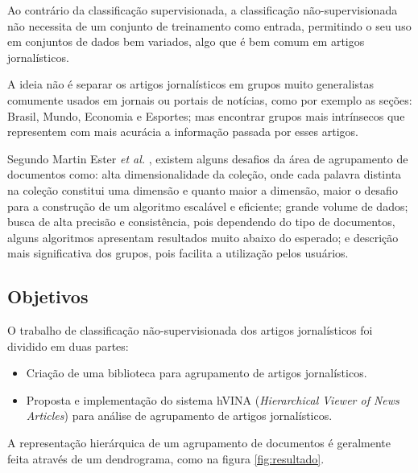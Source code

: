 \documentclass[a4paper,12pt]{article}
\begin{document}
Ao contrário da classificação supervisionada, a classificação não-supervisionada não necessita de um conjunto de treinamento como entrada, permitindo o seu uso em conjuntos de dados bem variados, algo que é bem comum em artigos jornalísticos.

A ideia não é separar os artigos jornalísticos em grupos muito generalistas comumente usados em jornais ou portais de notícias, como por exemplo as seções: Brasil, Mundo, Economia e Esportes; mas encontrar grupos mais intrínsecos que representem com mais acurácia a informação passada por esses artigos.

Segundo Martin Ester \textit{et al.} \cite{Ester03}, existem alguns desafios da área de agrupamento de documentos como: alta dimensionalidade da coleção, onde cada palavra distinta na coleção constitui uma dimensão e quanto maior a dimensão, maior o desafio para a construção de um algoritmo escalável e eficiente; grande volume de dados; busca de alta precisão e consistência, pois dependendo do tipo de documentos, alguns algoritmos apresentam resultados muito abaixo do esperado; e descrição mais significativa dos grupos, pois facilita a utilização pelos usuários.

\subsection{Objetivos}

O trabalho de classificação não-supervisionada dos artigos jornalísticos foi dividido em duas partes:

\begin{itemize}
\item Criação de uma biblioteca para agrupamento de artigos jornalísticos.
\item Proposta e implementação do sistema hVINA (\textit{Hierarchical Viewer of News Articles}) para análise de agrupamento de artigos jornalísticos.
\end{itemize}

A representação hierárquica de um agrupamento de documentos é geralmente feita através de um dendrograma, como na figura \ref{fig:resultado}.
\end{document}
